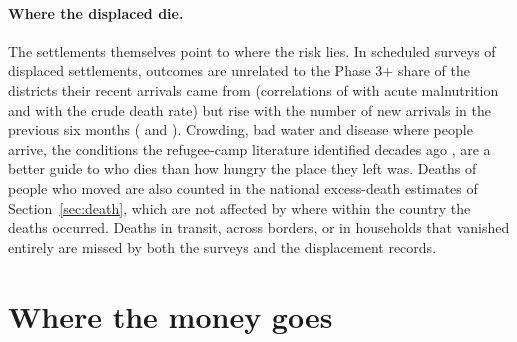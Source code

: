 \documentclass[11pt]{article}
\begin{document}
\paragraph{Where the displaced die.} The settlements themselves point to where the risk lies. In \dpDN{} scheduled surveys of \dpDSettlements{} displaced settlements, outcomes are unrelated to the Phase 3+ share of the districts their recent arrivals came from (correlations of \dpDOriginGam{} with acute malnutrition and \dpDOriginCdr{} with the crude death rate) but rise with the number of new arrivals in the previous six months (\dpDArrGam{} and \dpDArrCdr{}). Crowding, bad water and disease where people arrive, the conditions the refugee-camp literature identified decades ago \citep{toole1990}, are a better guide to who dies than how hungry the place they left was. Deaths of people who moved are also counted in the national excess-death estimates of Section~\ref{sec:death}, which are not affected by where within the country the deaths occurred. Deaths in transit, across borders, or in households that vanished entirely are missed by both the surveys and the displacement records.

\section{Where the money goes}\label{sec:money}
\end{document}
